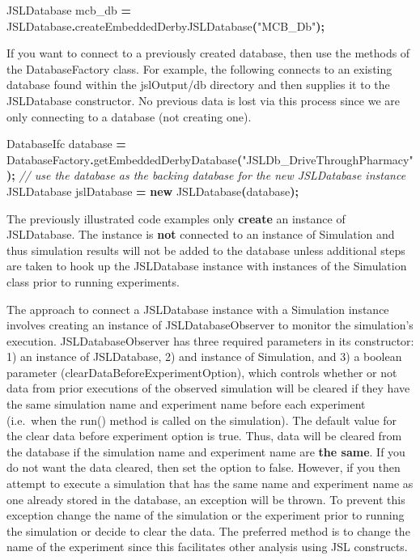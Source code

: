 \documentclass[
]{book}
\newenvironment{Shaded}{\begin{snugshade}}{\end{snugshade}}
\newcommand{\CommentTok}[1]{\textcolor[rgb]{0.56,0.35,0.01}{\textit{#1}}}
\newcommand{\FunctionTok}[1]{\textcolor[rgb]{0.00,0.00,0.00}{#1}}
\newcommand{\KeywordTok}[1]{\textcolor[rgb]{0.13,0.29,0.53}{\textbf{#1}}}
\newcommand{\NormalTok}[1]{#1}
\newcommand{\OperatorTok}[1]{\textcolor[rgb]{0.81,0.36,0.00}{\textbf{#1}}}
\newcommand{\StringTok}[1]{\textcolor[rgb]{0.31,0.60,0.02}{#1}}
\theoremstyle{definition}
\theoremstyle{definition}
\theoremstyle{definition}
\theoremstyle{definition}
\theoremstyle{remark}
\begin{document}
\begin{Shaded}
\begin{Highlighting}[]
\NormalTok{JSLDatabase mcb\_db }\OperatorTok{=}\NormalTok{ JSLDatabase}\OperatorTok{.}\FunctionTok{createEmbeddedDerbyJSLDatabase}\OperatorTok{(}\StringTok{"MCB\_Db"}\OperatorTok{);}
\end{Highlighting}
\end{Shaded}

If you want to connect to a previously created database, then use the
methods of the DatabaseFactory class. For example, the following
connects to an existing database found within the jslOutput/db directory
and then supplies it to the JSLDatabase constructor. No previous data is
lost via this process since we are only connecting to a database (not
creating one).

\begin{Shaded}
\begin{Highlighting}[]
\NormalTok{DatabaseIfc database }\OperatorTok{=}\NormalTok{ DatabaseFactory}\OperatorTok{.}\FunctionTok{getEmbeddedDerbyDatabase}\OperatorTok{(}\StringTok{"JSLDb\_DriveThroughPharmacy"}\OperatorTok{);}
\CommentTok{// use the database as the backing database for the new JSLDatabase instance}
\NormalTok{JSLDatabase jslDatabase }\OperatorTok{=} \KeywordTok{new} \FunctionTok{JSLDatabase}\OperatorTok{(}\NormalTok{database}\OperatorTok{);}
\end{Highlighting}
\end{Shaded}

The previously illustrated code examples only \textbf{create} an instance of
JSLDatabase. The instance is \textbf{not} connected to an instance of
Simulation and thus simulation results will not be added to the database
unless additional steps are taken to hook up the JSLDatabase instance
with instances of the Simulation class prior to running experiments.

The approach to connect a JSLDatabase instance with a Simulation
instance involves creating an instance of JSLDatabaseObserver to monitor
the simulation's execution. JSLDatabaseObserver has three required
parameters in its constructor: 1) an instance of JSLDatabase, 2) and
instance of Simulation, and 3) a boolean parameter
(clearDataBeforeExperimentOption), which controls whether or not data
from prior executions of the observed simulation will be cleared if they
have the same simulation name and experiment name before each experiment
(i.e.~when the run() method is called on the simulation). The default
value for the clear data before experiment option is true. Thus, data
will be cleared from the database if the simulation name and experiment
name are \textbf{the same}. If you do not want the data cleared, then set the
option to false. However, if you then attempt to execute a simulation
that has the same name and experiment name as one already stored in the
database, an exception will be thrown. To prevent this exception change
the name of the simulation or the experiment prior to running the
simulation or decide to clear the data. The preferred method is to
change the name of the experiment since this facilitates other analysis
using JSL constructs.
\end{document}
